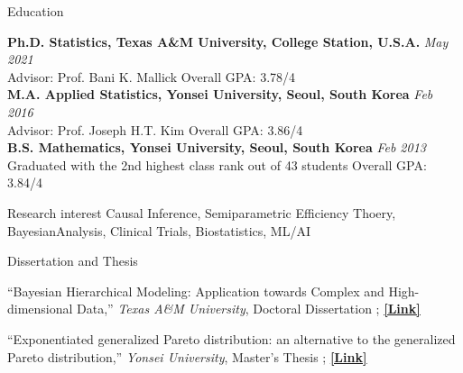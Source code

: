\documentclass[
	11pt, %
]{resume} %
\begin{document}

\begin{rSection}{Education}
	
	\textbf{Ph.D. Statistics, Texas A\&M University, College Station, U.S.A.} \hfill \textit{May 2021} \\ 
Advisor: Prof. Bani K. Mallick
\hfill {Overall GPA: 3.78/4}
\\
	\textbf{M.A. Applied Statistics, Yonsei University, Seoul, South Korea} \hfill {\em Feb 2016} \\ 
Advisor: Prof. Joseph H.T. Kim
\hfill {Overall GPA: 3.86/4}
\\
{\bf B.S. Mathematics, Yonsei University, Seoul, South Korea} \hfill {\em Feb 2013} \\ 
Graduated with the 2nd highest class rank out of 43 students
\hfill {Overall GPA: 3.84/4}
\end{rSection}

\begin{rSection}{Research interest}
Causal Inference, Semiparametric Efficiency Thoery, BayesianAnalysis, Clinical Trials, Biostatistics, ML/AI
\end{rSection}


\begin{rSection}{Dissertation and Thesis}
\item[$\cdot$] ``Bayesian Hierarchical Modeling: Application towards Complex and High-dimensional Data,''
\textit{Texas A\&M University}, Doctoral Dissertation
 ;
\href{https://oaktrust.library.tamu.edu/handle/1969.1/195691}{\underline{\textbf{[Link]}}}
\item[$\cdot$] ``Exponentiated generalized Pareto distribution: an alternative to the generalized Pareto distribution,''
\textit{Yonsei University}, Master's Thesis
;
\href{https://library.yonsei.ac.kr/search/detail/CAT000001777455?briefLink=/main/searchBrief?q=Seyoon+lee}{\underline{\textbf{[Link]}}}
\end{rSection}
\end{document}
